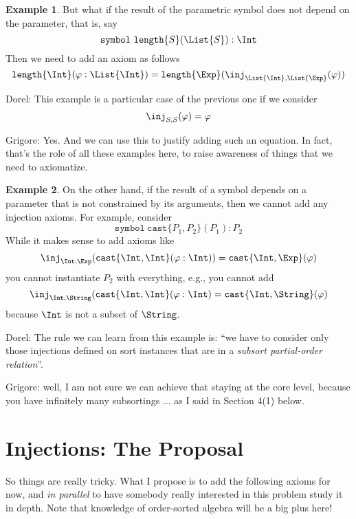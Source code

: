 \documentclass{article}
\newcommand\comment[2]{\par\noindent\color{red}#1: #2\color{black}\par\noindent}
\newcommand\dl{\comment{Dorel}}
\newcommand\gr{\comment{Grigore}}
\theoremstyle{definition}
\newtheorem{example}{Example}[section]
\theoremstyle{definition}
\theoremstyle{definition}
\theoremstyle{definition}
\theoremstyle{definition}
\theoremstyle{theorem}
\theoremstyle{theorem}
\theoremstyle{theorem}
\theoremstyle{theorem}
\theoremstyle{theorem}
\newcommand{\poly}[2]{\texttt{#1}\{#2\}}
\newcommand{\KWsymbol}{\texttt{symbol}}
\begin{document}
\begin{example}\label{consistency-parametric-arg-only}
But what if the result of the parametric symbol
does not depend on the parameter, that is, say
\[\KWsymbol\ \poly{length}{S}(\List{S}):\Int\]
Then we need to add an axiom as follows
\[\poly{length}{\Int}(\varphi:\List{\Int})
= \poly{length}{\Exp}(\inj_{\List{\Int},\List{\Exp}}(\varphi))\]
\dl{This example is a particular case of the previous one if we consider
\[\inj_{S,S}(\varphi)=\varphi\]
}
\gr{Yes.  And we can use this to justify adding such an equation.  In fact, that's the role of all these examples here, to raise awareness of things that we need to axiomatize.}
\end{example}

\begin{example}\label{consistency-parametric-result-free}
On the other hand, if the result of a symbol depends on
a parameter that is not constrained by its arguments,
then we cannot add any injection axioms.
For example, consider
\[\KWsymbol\ \poly{cast}{P_1,P_2}(P_1):P_2\]
While it makes sense to add axioms like
\[\inj_{\Int,\Exp}(\poly{cast}{\Int,\Int}(\varphi:\Int))
= \poly{cast}{\Int,\Exp}(\varphi)\]
you cannot instantiate \(P_2\) with everything, e.g., you cannot add
\[\inj_{\Int,\String}(\poly{cast}{\Int,\Int}(\varphi:\Int)
= \poly{cast}{\Int,\String}(\varphi)\]
because \(\Int\) is not a subset of \(\String\).
\dl{The rule we can learn from this example is: ``we have to consider only those injections defined on sort instances that are in a \emph{subsort partial-order relation}''.
}
\gr{well, I am not sure we can achieve that staying at the core level, because you have infinitely many subsortings ...
as I said in Section 4(1) below.}
\end{example}

\section{Injections: The Proposal}
\label{sec:proposal}
So things are really tricky.
What I propose is to add the following axioms for now,
and \emph{in parallel} to have somebody really interested in this
problem study it in depth.
Note that knowledge of order-sorted algebra will be a big plus here!
\end{document}
